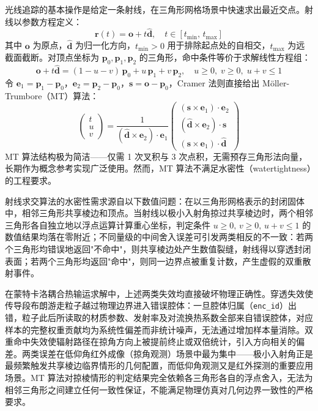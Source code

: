 光线追踪的基本操作是给定一条射线，在三角形网格场景中快速求出最近交点。射线以参数方程定义：
\begin{equation}
    \mathbf{r}(t) = \mathbf{o} + t\hat{\mathbf{d}}, \quad t \in [t_{\min},\, t_{\max}]
    \label{eq:ray}
\end{equation}
其中 $\mathbf{o}$ 为原点，$\hat{\mathbf{d}}$ 为归一化方向，$t_{\min} > 0$ 用于排除起点处的自相交，$t_{\max}$ 为远截面截断。对顶点坐标为 $\mathbf{p}_0, \mathbf{p}_1, \mathbf{p}_2$ 的三角形，命中条件等价于求解线性方程组：
\begin{equation}
    \mathbf{o} + t\hat{\mathbf{d}}
    = (1 - u - v)\,\mathbf{p}_0 + u\,\mathbf{p}_1 + v\,\mathbf{p}_2,
    \quad u \geq 0,\; v \geq 0,\; u + v \leq 1
    \label{eq:mt_system}
\end{equation}
令 $\mathbf{e}_1 = \mathbf{p}_1 - \mathbf{p}_0$，$\mathbf{e}_2 = \mathbf{p}_2 - \mathbf{p}_0$，$\mathbf{s} = \mathbf{o} - \mathbf{p}_0$，Cramer 法则直接给出 Möller-Trumbore（MT）算法：
\begin{equation}
\begin{pmatrix} t \\ u \\ v \end{pmatrix}
= \frac{1}{(\hat{\mathbf{d}} \times \mathbf{e}_2) \cdot \mathbf{e}_1}
  \begin{pmatrix}
    (\mathbf{s} \times \mathbf{e}_1) \cdot \mathbf{e}_2 \\
    (\hat{\mathbf{d}} \times \mathbf{e}_2) \cdot \mathbf{s} \\
    (\mathbf{s} \times \mathbf{e}_1) \cdot \hat{\mathbf{d}}
  \end{pmatrix}
\label{eq:moller_trumbore}
\end{equation}
MT 算法结构极为简洁——仅需 1 次叉积与 3 次点积，无需预存三角形法向量，长期作为概念参考实现广泛使用。然而，MT 算法不满足水密性（watertightness）的工程要求。

射线求交算法的水密性需求源自以下数值问题：在以三角形网格表示的封闭固体中，相邻三角形共享棱边和顶点。当射线以极小入射角掠过共享棱边时，两个相邻三角形各自独立地以浮点运算计算重心坐标，判定条件 $u \geq 0,\, v \geq 0,\, u+v \leq 1$ 的数值结果均落在零附近；不同量级的中间舍入误差可引发两类相反的不一致：若两个三角形均错误地返回"不命中"，则共享棱边处产生数值裂缝，射线得以穿透封闭表面；若两个三角形均返回"命中"，则同一边界点被重复计数，产生虚假的双重散射事件。

在蒙特卡洛耦合热输运求解中，上述两类失效均直接破坏物理正确性。穿透失效使传导段布朗游走粒子越过物理边界进入错误腔体：一旦腔体归属（\texttt{enc\_id}）出错，粒子此后所读取的材质参数、发射率及对流换热系数全部来自错误腔体，对应样本的完整权重贡献均为系统性偏差而非统计噪声，无法通过增加样本量消除。双重命中失效使辐射路径在掠角方向上被提前终止或双倍统计，引入方向相关的偏差。两类误差在低仰角红外成像（掠角观测）场景中最为集中——极小入射角正是最频繁触发共享棱边临界情形的几何配置，而低仰角观测又是红外探测的重要应用场景。MT 算法对掠棱情形的判定结果完全依赖各三角形各自的浮点舍入，无法为相邻三角形之间建立任何一致性保证，不能满足物理仿真对几何边界一致性的严格要求。

